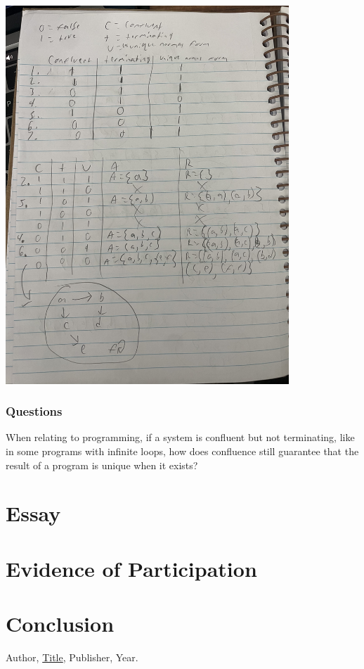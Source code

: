 \documentclass{article}
\theoremstyle{theorem}
\theoremstyle{definition}
\theoremstyle{remark}
\begin{document}
\includegraphics[width=0.8\textwidth]{../img/IMG_2710.jpg}

\subsubsection{Questions}

When relating to programming, if a system is confluent but not terminating, like in some programs with infinite loops, how does confluence still guarantee that the result of a program is unique when it exists?

\section{Essay}

\section{Evidence of Participation}

\section{Conclusion}\label{conclusion}

\begin{thebibliography}{99}
 Author, \href{https://en.wikipedia.org/wiki/LaTeX}{Title}, Publisher, Year.
\end{thebibliography}
\end{document}
